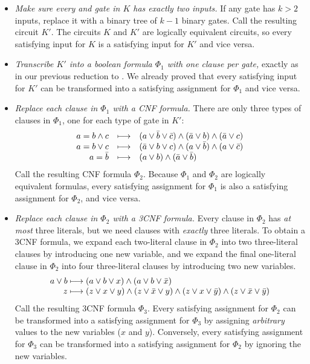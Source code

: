 \begin{itemize}
\item \textit{Make sure every  and  gate in $K$ has exactly two inputs.}
If any gate has $k > 2$ inputs, replace it with a binary tree of $k-1$ binary gates.
Call the resulting circuit $K'$.
The circuits $K$ and $K'$ are logically equivalent circuits, so every satisfying input for $K$ is a satisfying input for $K'$ and vice versa.
\item \textit{Transcribe $K'$ into a boolean formula $\Phi_1$ with one clause per gate,} exactly as in our previous reduction to .
We already proved that every satisfying input for $K'$ can be transformed into a satisfying assignment for $\Phi_1$ and vice versa.
\item \textit{Replace each clause in $\Phi_1$ with a CNF formula.}
There are only three types of clauses in $\Phi_1$, one for each type of gate in $K'$:
\[
\begin{array}{r@{\quad}c@{\quad}l}
a = b \wedge c & \longmapsto & (a \vee \bar{b} \vee \bar{c}) \wedge (\bar{a} \vee b) \wedge (\bar{a} \vee c)\\
a = b \vee c & \longmapsto & (\bar{a} \vee b \vee c) \wedge (a \vee \bar{b}) \wedge (a \vee \bar{c})\\
a = \bar{b} & \longmapsto & (a \vee b) \wedge (\bar{a} \vee \bar{b})
\end{array}
\]
Call the resulting CNF formula $\Phi_2$.
Because $\Phi_1$ and $\Phi_2$ are logically equivalent formulas, every satisfying assignment for $\Phi_1$ is also a satisfying assignment for $\Phi_2$, and vice versa.
\item \textit{Replace each clause in $\Phi_2$ with a 3CNF formula.}
Every clause in $\Phi_2$ has \textit{at most} three literals, but we need clauses with \textit{exactly} three literals.
To obtain a 3CNF formula, we expand each two-literal clause in $\Phi_2$ into two three-literal clauses by introducing one new variable, and we expand the final one-literal clause in $\Phi_2$ into four three-literal clauses by introducing two new variables.
\[
\begin{array}{r@{}l}
a \vee b & {}\longmapsto (a \vee b \vee x) \wedge (a \vee b \vee \bar{x})\\
z & {}\longmapsto (z \vee x \vee y) \wedge (z \vee \bar{x} \vee y) \wedge (z \vee x \vee \bar{y}) \wedge (z \vee \bar{x} \vee \bar{y})
\end{array}
\]
Call the resulting 3CNF formula $\Phi_3$.
Every satisfying assignment for $\Phi_2$ can be transformed into a satisfying assignment for $\Phi_3$ by assigning \textit{arbitrary} values to the new variables ($x$ and $y$).
Conversely, every satisfying assignment for $\Phi_3$ can be transformed into a satisfying assignment for $\Phi_2$ by ignoring the new variables.
\end{itemize}
